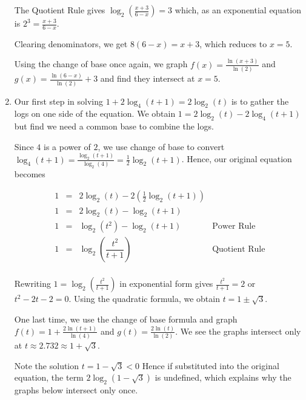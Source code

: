 \documentclass{ximera}
\begin{document}
\begin{example}
\begin{enumerate}
The  Quotient Rule gives $\log_{2}\left(\frac{x+3}{6-x}\right) = 3$ which, as an exponential equation is $2^{3} = \frac{x+3}{6-x}$. 

\smallskip

Clearing denominators, we get $8(6-x) = x+3$, which reduces to  $x = 5$. 

\smallskip

Using the change of base once again, we graph $f(x) = \frac{\ln(x+3)}{\ln(2)}$ and $g(x) =  \frac{\ln(6-x)}{\ln(2)} + 3$ and find they intersect at $x=5$.


\item Our first step in solving $1 + 2 \log_{4}(t+1) = 2 \log_{2}(t)$ is to gather the logs on one side of the equation.  We obtain  $1 = 2 \log_{2}(t) - 2 \log_{4}(t+1)$ but find we need a common base to combine the logs.

\smallskip

Since $4$ is a power of $2$, we use change of base to convert  $\log_{4}(t+1) = \frac{\log_{2}(t+1)}{\log_{2}(4)} = \frac{1}{2} \log_{2}(t+1)$.  Hence, our original equation becomes  

\[ \begin{array}{rclr}

1 & = & 2 \log_{2}(t) - 2 \left(\frac{1}{2} \log_{2}(t+1)\right) & \\ [2pt]
1 &= & 2\log_{2}(t) - \log_{2}(t+1) & \\ [2pt]
1 & = & \log_{2}\left(t^2\right) - \log_{2}(t+1) & \text{Power Rule} \\ [6pt]
1 & = & \log_{2}\left( \dfrac{t^{2}}{t+1}\right) & \text{Quotient Rule} \\ \end{array}\]

Rewriting $1 = \log_{2}\left( \frac{t^{2}}{t+1}\right)$ in exponential form gives  $ \frac{t^{2}}{t+1} = 2$ or $t^2 -2t-2 = 0$.  Using the quadratic formula, we obtain  $t = 1 \pm \sqrt{3}$.

One last time, we use the change of base formula and graph  $f(t) = 1 + \frac{2\ln(t+1)}{\ln(4)}$ and $g(t) = \frac{2 \ln(t)}{\ln(2)}$.   We see the graphs intersect only at $t \approx 2.732 \approx 1 + \sqrt{3}$.  

\smallskip

Note the solution $t = 1 - \sqrt{3} < 0$ Hence if substituted into the original equation, the term $2 \log_{2}\left(1 - \sqrt{3}\right)$ is undefined, which explains why the graphs below intersect only once.

\begin{center}


\end{center}
\end{enumerate}
\end{example}
\end{document}

